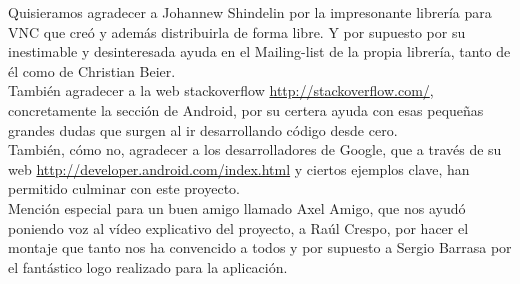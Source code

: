 Quisieramos agradecer a Johannew Shindelin por la impresonante librer\'ia para VNC que cre\'o y adem\'as distribuirla de forma libre. Y por supuesto por su inestimable y desinteresada ayuda en el Mailing-list de la propia librer\'ia, tanto de \'el como de Christian Beier.\\

Tambi\'en agradecer a la web stackoverflow \url{http://stackoverflow.com/}, concretamente la secci\'on de Android, por su certera ayuda con esas pequeñas grandes dudas que surgen al ir desarrollando c\'odigo desde cero.\\

Tambi\'en, c\'omo no, agradecer a los desarrolladores de Google, que a trav\'es de su web \url{http://developer.android.com/index.html} y ciertos ejemplos clave, han permitido culminar con este proyecto.\\

Menci\'on especial para un buen amigo llamado Axel Amigo, que nos ayud\'o poniendo voz al v\'ideo explicativo del proyecto, a Ra\'ul Crespo, por hacer el montaje que tanto nos ha convencido a todos y por supuesto a Sergio Barrasa por el fant\'astico logo realizado para la aplicaci\'on.\\
